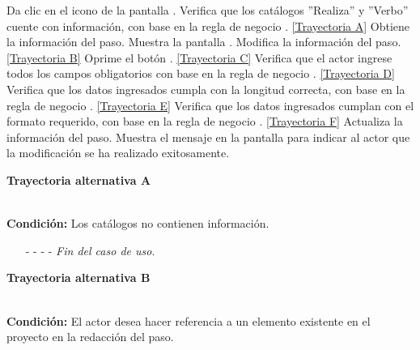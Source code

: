 	\begin{UCtrayectoria}
		\UCpaso[\UCactor] Da clic en el icono \editar de la pantalla .
		\UCpaso[\UCsist] Verifica que los catálogos ''Realiza'' y ''Verbo'' cuente con información, con base en la regla de negocio . \hyperlink{CU12-1-1-1-1-2:TAA}{[Trayectoria A]}
		\UCpaso[\UCsist] Obtiene la información del paso.
		\UCpaso[\UCsist] Muestra la pantalla .
		\UCpaso[\UCactor] Modifica la información del paso. \hyperlink{CU12-1-1-1-1-2:TAB}{[Trayectoria B]}\label{CU12.1.1.1.1.2-P5}
		\UCpaso[\UCactor] Oprime el botón . \hyperlink{CU12-1-1-1-1-2:TAC}{[Trayectoria C]}  \label{CU12.1.1.1.1.2-P6}
		\UCpaso[\UCsist] Verifica que el actor ingrese todos los campos obligatorios con base en la regla de negocio . \hyperlink{CU12-1-1-1-1-2:TAD}{[Trayectoria D]}
		\UCpaso[\UCsist] Verifica que los datos ingresados cumpla con la longitud correcta, con base en la regla de negocio . \hyperlink{CU12-1-1-1-1-2:TAE}{[Trayectoria E]}
		\UCpaso[\UCsist] Verifica que los datos ingresados cumplan con el formato requerido, con base en la regla de negocio . \hyperlink{CU12-1-1-1-1-2:TAF}{[Trayectoria F]}
		\UCpaso[\UCsist] Actualiza la información del paso.
		\UCpaso[\UCsist] Muestra el mensaje  en la pantalla  para indicar al actor que la modificación se ha realizado exitosamente.
	\end{UCtrayectoria}		
\hypertarget{CU12-1-1-1-1-2:TAA}{\textbf{Trayectoria alternativa A}}\\
\noindent \textbf{Condición:} Los catálogos no contienen información.
\begin{enumerate}
	\UCpaso[\UCsist] Muestra el mensaje  en la pantalla  para indicar que no es posible realizar la operación debido a la falta de información necesaria para el sistema.
	\item[- -] - - {\em {Fin del caso de uso}}.%
\end{enumerate}
\hypertarget{CU12-1-1-1-1-2:TAB}{\textbf{Trayectoria alternativa B}}\\
\noindent \textbf{Condición:} El actor desea hacer referencia a un elemento existente en el proyecto en la redacción del paso.
